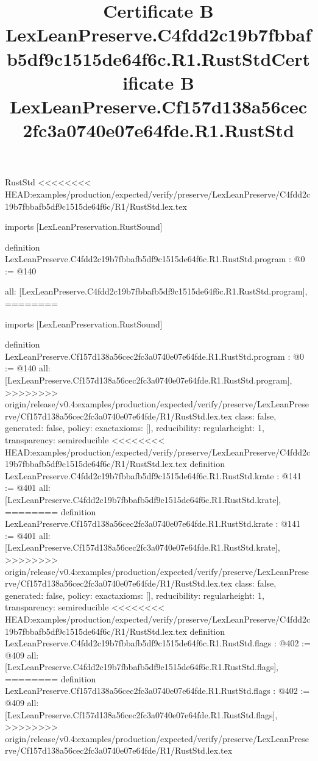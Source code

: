 \begin{lexlean}{RustStd}
<<<<<<<< HEAD:examples/production/expected/verify/preserve/LexLeanPreserve/C4fdd2c19b7fbbafb5df9c1515de64f6c/R1/RustStd.lex.tex
\title{Certificate B LexLeanPreserve.C4fdd2c19b7fbbafb5df9c1515de64f6c.R1.RustStd}
\begin{coremodule}
imports [LexLeanPreservation.RustSound]

definition LexLeanPreserve.C4fdd2c19b7fbbafb5df9c1515de64f6c.R1.RustStd.program : @0 := @140 {
  all: [LexLeanPreserve.C4fdd2c19b7fbbafb5df9c1515de64f6c.R1.RustStd.program],
========
\title{Certificate B LexLeanPreserve.Cf157d138a56cec2fc3a0740e07e64fde.R1.RustStd}
\begin{coremodule}
imports [LexLeanPreservation.RustSound]

definition LexLeanPreserve.Cf157d138a56cec2fc3a0740e07e64fde.R1.RustStd.program : @0 := @140 {
  all: [LexLeanPreserve.Cf157d138a56cec2fc3a0740e07e64fde.R1.RustStd.program],
>>>>>>>> origin/release/v0.4:examples/production/expected/verify/preserve/LexLeanPreserve/Cf157d138a56cec2fc3a0740e07e64fde/R1/RustStd.lex.tex
  class: false,
  generated: false,
  policy: exact{axioms: []},
  reducibility: regular{height: 1},
  transparency: semireducible
}
<<<<<<<< HEAD:examples/production/expected/verify/preserve/LexLeanPreserve/C4fdd2c19b7fbbafb5df9c1515de64f6c/R1/RustStd.lex.tex
definition LexLeanPreserve.C4fdd2c19b7fbbafb5df9c1515de64f6c.R1.RustStd.krate : @141 := @401 {
  all: [LexLeanPreserve.C4fdd2c19b7fbbafb5df9c1515de64f6c.R1.RustStd.krate],
========
definition LexLeanPreserve.Cf157d138a56cec2fc3a0740e07e64fde.R1.RustStd.krate : @141 := @401 {
  all: [LexLeanPreserve.Cf157d138a56cec2fc3a0740e07e64fde.R1.RustStd.krate],
>>>>>>>> origin/release/v0.4:examples/production/expected/verify/preserve/LexLeanPreserve/Cf157d138a56cec2fc3a0740e07e64fde/R1/RustStd.lex.tex
  class: false,
  generated: false,
  policy: exact{axioms: []},
  reducibility: regular{height: 1},
  transparency: semireducible
}
<<<<<<<< HEAD:examples/production/expected/verify/preserve/LexLeanPreserve/C4fdd2c19b7fbbafb5df9c1515de64f6c/R1/RustStd.lex.tex
definition LexLeanPreserve.C4fdd2c19b7fbbafb5df9c1515de64f6c.R1.RustStd.flags : @402 := @409 {
  all: [LexLeanPreserve.C4fdd2c19b7fbbafb5df9c1515de64f6c.R1.RustStd.flags],
========
definition LexLeanPreserve.Cf157d138a56cec2fc3a0740e07e64fde.R1.RustStd.flags : @402 := @409 {
  all: [LexLeanPreserve.Cf157d138a56cec2fc3a0740e07e64fde.R1.RustStd.flags],
>>>>>>>> origin/release/v0.4:examples/production/expected/verify/preserve/LexLeanPreserve/Cf157d138a56cec2fc3a0740e07e64fde/R1/RustStd.lex.tex
}}}
\end{coremodule}}
\end{coremodule}
\end{lexlean}
